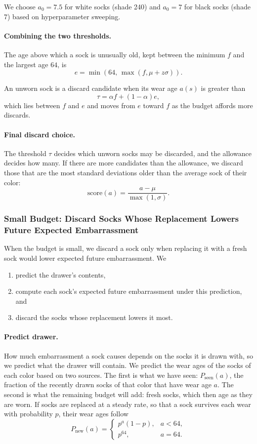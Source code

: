 \documentclass[11pt]{article}
\begin{document}
We choose \(a_0=7.5\) for white socks (shade 240) and \(a_0=7\) for black socks (shade 7) based on hyperparameter sweeping.

\paragraph{Combining the two thresholds.}
The age above which a sock is unusually old, kept between the minimum \(f\) and the largest age \(64\), is
\[
e
=
\min\left(
64,\,
\max(f,\mu+z\sigma)
\right).
\]

An unworn sock is a discard candidate when its wear age \(a(s)\) is greater than
\[
\tau
=
\alpha f+(1-\alpha)e,
\]
which lies between \(f\) and \(e\) and moves from \(e\) toward \(f\) as the budget affords more discards.

\paragraph{Final discard choice.}
The threshold \(\tau\) decides which unworn socks may be discarded, and the allowance decides how many. If there are more candidates than the allowance, we discard those that are the most standard deviations older than the average sock of their color:
\[
\mathrm{score}(a)
=
\frac{a-\mu}{\max(1,\sigma)}.
\]

\subsubsection{Small Budget: Discard Socks Whose Replacement Lowers Future Expected Embarrassment}
\label{sec:small-budget}

When the budget is small, we discard a sock only when replacing it with a fresh sock would lower expected future embarrassment. We
\begin{enumerate}[label=(\arabic*)]
    \item predict the drawer's contents,
    \item compute each sock's expected future embarrassment under this prediction, and
    \item discard the socks whose replacement lowers it most.
\end{enumerate}

\paragraph{Predict drawer.}
How much embarrassment a sock causes depends on the socks it is drawn with, so we predict what the drawer will contain. We predict the wear ages of the socks of each color based on two sources. The first is what we have seen: \(P_{\mathrm{seen}}(a)\), the fraction of the recently drawn socks of that color that have wear age \(a\). The second is what the remaining budget will add: fresh socks, which then age as they are worn. If socks are replaced at a steady rate, so that a sock survives each wear with probability \(p\), their wear ages follow
\[
P_{\mathrm{new}}(a)
=
\begin{cases}
p^a(1-p), & a<64,\\
p^{64}, & a=64.
\end{cases}
\]
\end{document}
